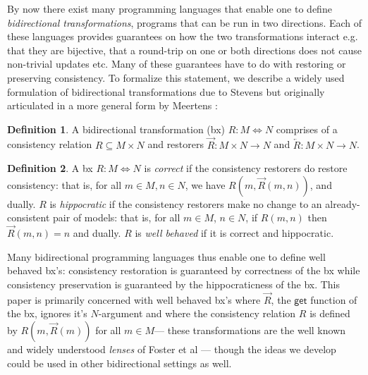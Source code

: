 \documentclass[acmsmall,review,anonymous]{acmart}\settopmatter{printfolios=true,printccs=false,printacmref=false}
\theoremstyle{definition}
\newtheorem{definition}{Definition}
\newcommand{\kw}[1]{\ensuremath{\mathsf{#1}}\xspace}
\newcommand{\get}{\ensuremath{\kw{get}}\xspace}
\begin{document}
By now there exist many programming languages that enable one to define {\em
bidirectional transformations}, programs that can be run in two
directions. Each of these languages provides guarantees on how the two
transformations interact e.g. that they are bijective, that a round-trip on
one or both directions does not cause non-trivial updates etc. Many of these
guarantees have to do with restoring or preserving consistency. To formalize
this statement, we describe a widely used formulation of bidirectional
transformations due to Stevens \cite{stevens2010bidirectional} but originally
articulated in a more general form by Meertens \cite{meertens1998designing}:
\begin{definition}
A bidirectional transformation (bx) $R: M \Leftrightarrow N$ comprises of a
consistency relation $R \subseteq M \times N$ and restorers $\overrightarrow{R}
: M \times N \rightarrow N$ and $\overleftarrow{R} : M \times N \longrightarrow
N$.
\end{definition}
\begin{definition}
A bx $R : M \Leftrightarrow N$ is {\em correct} if the consistency restorers do
restore consistency: that is, for all $m \in M, n \in N$, we have $R(m,
\overrightarrow{R}(m, n))$, and dually. $R$ is {\em hippocratic} if the
consistency restorers make no change to an already-consistent pair of models:
that is, for all $m \in M$, $n \in N$, if $R(m, n)$ then $\overrightarrow{R}(m,
n) = n$ and dually. $R$ is {\em well behaved} if it is correct and hippocratic.
\end{definition}

Many bidirectional programming languages thus enable one to define
well behaved bx's: consistency restoration is guaranteed by correctness of the
bx while consistency preservation is guaranteed by the hippocraticness of the
bx. This paper is primarily concerned with well behaved bx's where
$\overrightarrow{R}$, the \get function of the bx, ignores it's $N$-argument and
where the consistency relation $R$ is defined by $R(m, \overrightarrow{R}(m))$
for all $m \in M$--- these transformations are the well known and widely
understood {\em lenses} of Foster et al \cite{foster2007combinators}--- though
the ideas we develop could be used in other bidirectional settings as well. 
\end{document}
